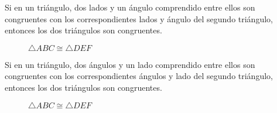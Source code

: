 \begin{postulate}
    Si en un triángulo, dos lados y un ángulo comprendido entre ellos son congruentes con los correspondientes lados y ángulo del segundo triángulo, entonces los dos triángulos son congruentes.

    \begin{figure}[h!]

        \centering

        \begin{subfigure}[b]{.5\textwidth}
            \centering
            
            \label{fig:congruence-sas1}
        \end{subfigure}%
        \begin{subfigure}[b]{.5\textwidth}
            \centering
            
            \label{fig:congruence-sas2}
        \end{subfigure}

        \centering
        \caption{$\triangle{ABC} \cong \triangle{DEF}$}
        \label{fig:congruencia-sas}
        
    \end{figure}    

\end{postulate}

\clearpage

\begin{postulate}
    Si en un triángulo, dos ángulos y un lado comprendido entre ellos son congruentes con los correspondientes ángulos y lado del segundo triángulo, entonces los dos triángulos son congruentes.

    \begin{figure}[h!]

        \centering

        \begin{subfigure}[b]{.5\textwidth}
            \centering
            
            \label{fig:congruence-asa1}
        \end{subfigure}%
        \begin{subfigure}[b]{.5\textwidth}
            \centering
            
            \label{fig:congruence-asa2}
        \end{subfigure}

        \centering
        \caption{$\triangle{ABC} \cong \triangle{DEF}$}
        \label{fig:congruencia-asa}
        
    \end{figure}    
    
\end{postulate}

